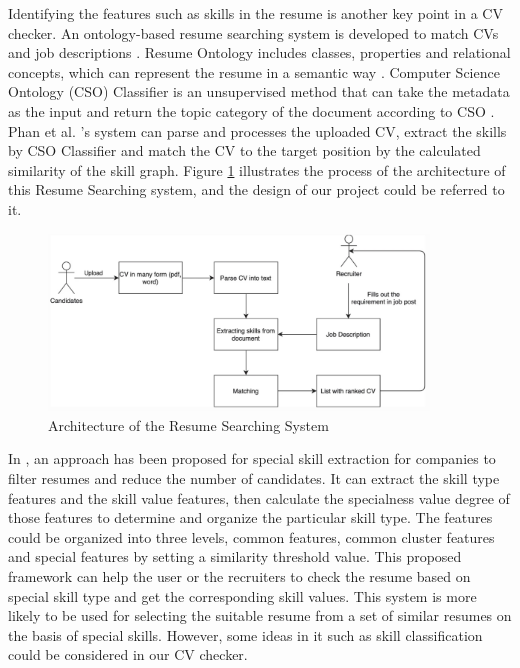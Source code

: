 Identifying the features such as skills in the resume is another key point in a CV checker. An ontology-based resume searching system is developed to match CVs and job descriptions \cite{phan2021ontology}. Resume Ontology includes classes, properties and relational concepts, which can represent the resume in a semantic way \cite{ccelik2013towards}. Computer Science Ontology (CSO) Classifier is an unsupervised method that can take the metadata as the input and return the topic category of the document according to CSO \cite{salatino2019cso}. Phan et al. \cite{phan2021ontology} 's system can parse and processes the uploaded CV, extract the skills by CSO Classifier and match the CV to the target position by the calculated similarity of the skill graph. Figure \ref{fig:3} illustrates the process of the architecture of this Resume Searching system, and the design of our project could be referred to it.

 \begin{figure}[H]
    \centering
    \includegraphics[width=0.9\textwidth]{images/architecture.png}
    \caption{Architecture of the Resume Searching System \cite{phan2021ontology}}
    \label{fig:3}
\end{figure}


In \cite{maheshwari2010approach}, an approach has been proposed for special skill extraction for companies to filter resumes and reduce the number of candidates. It can extract the skill type features and the skill value features, then calculate the specialness value degree of those features to determine and organize the particular skill type. The features could be organized into three levels, common features, common cluster features and special features by setting a similarity threshold value. This proposed framework can help the user or the recruiters to check the resume based on special skill type and get the corresponding skill values. This system is more likely to be used for selecting the suitable resume from a set of similar resumes on the basis of special skills. However, some ideas in it such as skill classification could be considered in our CV checker. 


